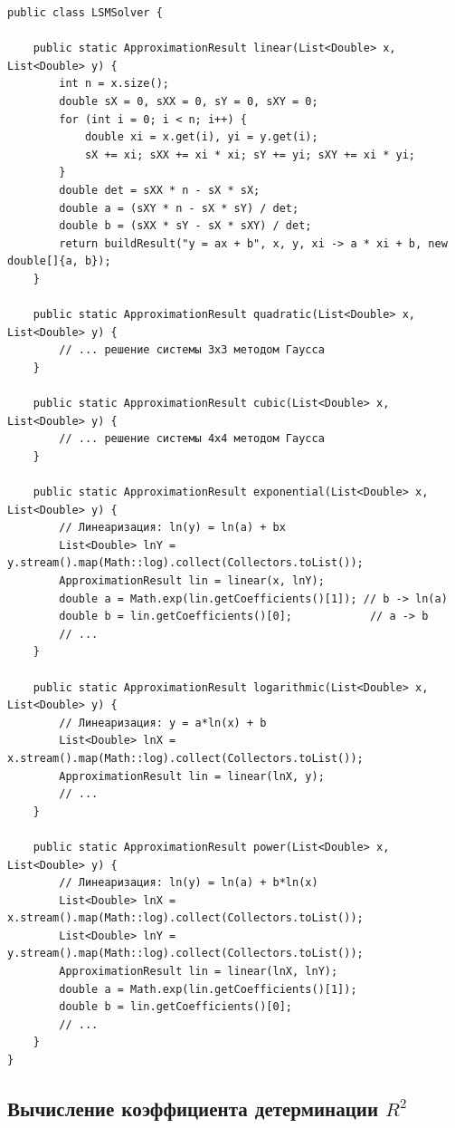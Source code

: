\begin{lstlisting}[style=javaStyle, label=code:lsm]
public class LSMSolver {
    
    public static ApproximationResult linear(List<Double> x, List<Double> y) {
        int n = x.size();
        double sX = 0, sXX = 0, sY = 0, sXY = 0;
        for (int i = 0; i < n; i++) {
            double xi = x.get(i), yi = y.get(i);
            sX += xi; sXX += xi * xi; sY += yi; sXY += xi * yi;
        }
        double det = sXX * n - sX * sX;
        double a = (sXY * n - sX * sY) / det;
        double b = (sXX * sY - sX * sXY) / det;
        return buildResult("y = ax + b", x, y, xi -> a * xi + b, new double[]{a, b});
    }

    public static ApproximationResult quadratic(List<Double> x, List<Double> y) {
        // ... решение системы 3x3 методом Гаусса
    }

    public static ApproximationResult cubic(List<Double> x, List<Double> y) {
        // ... решение системы 4x4 методом Гаусса
    }

    public static ApproximationResult exponential(List<Double> x, List<Double> y) {
        // Линеаризация: ln(y) = ln(a) + bx
        List<Double> lnY = y.stream().map(Math::log).collect(Collectors.toList());
        ApproximationResult lin = linear(x, lnY);
        double a = Math.exp(lin.getCoefficients()[1]); // b -> ln(a)
        double b = lin.getCoefficients()[0];            // a -> b
        // ...
    }

    public static ApproximationResult logarithmic(List<Double> x, List<Double> y) {
        // Линеаризация: y = a*ln(x) + b
        List<Double> lnX = x.stream().map(Math::log).collect(Collectors.toList());
        ApproximationResult lin = linear(lnX, y);
        // ...
    }

    public static ApproximationResult power(List<Double> x, List<Double> y) {
        // Линеаризация: ln(y) = ln(a) + b*ln(x)
        List<Double> lnX = x.stream().map(Math::log).collect(Collectors.toList());
        List<Double> lnY = y.stream().map(Math::log).collect(Collectors.toList());
        ApproximationResult lin = linear(lnX, lnY);
        double a = Math.exp(lin.getCoefficients()[1]);
        double b = lin.getCoefficients()[0];
        // ...
    }
}
\end{lstlisting}

\subsection{Вычисление коэффициента детерминации $R^2$}

